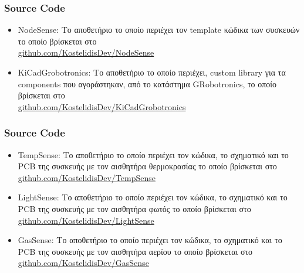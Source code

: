 \documentclass{beamer}
\begin{document}
\begin{frame}
\frametitle{Source Code}
\begin{itemize}
	\item NodeSense: Το αποθετήριο το οποίο περιέχει τον template κώδικα των συσκευών το οποίο βρίσκεται στο \\
	\href{https://github.com/KostelidisDev/NodeSense}{github.com/KostelidisDev/NodeSense}
	\item KiCadGrobotronics: Το αποθετήριο το οποίο περιέχει, custom library για τα components που αγοράστηκαν, από το κατάστημα GRobotronics, το οποίο βρίσκεται στο \\
	\href{https://github.com/KostelidisDev/KiCadGrobotronics}{github.com/KostelidisDev/KiCadGrobotronics}
\end{itemize}
\end{frame}

\begin{frame}
\frametitle{Source Code}
\begin{itemize}
	\item TempSense: Το αποθετήριο το οποίο περιέχει τον κώδικα, το σχηματικό και το PCB της συσκευής με τον αισθητήρα θερμοκρασίας το οποίο βρίσκεται στο \\
	\href{https://github.com/KostelidisDev/TempSense}{github.com/KostelidisDev/TempSense}
	\item LightSense: Το αποθετήριο το οποίο περιέχει τον κώδικα, το σχηματικό και το PCB της συσκευής με τον αισθητήρα φωτός το οποίο βρίσκεται στο \\
	\href{https://github.com/KostelidisDev/LightSense}{github.com/KostelidisDev/LightSense}
	\item GasSense: Το αποθετήριο το οποίο περιέχει τον κώδικα, το σχηματικό και το PCB της συσκευής με τον αισθητήρα αερίου το οποίο βρίσκεται στο \\
	\href{https://github.com/KostelidisDev/GasSense}{github.com/KostelidisDev/GasSense}
\end{itemize}
\end{frame}
\end{document}
